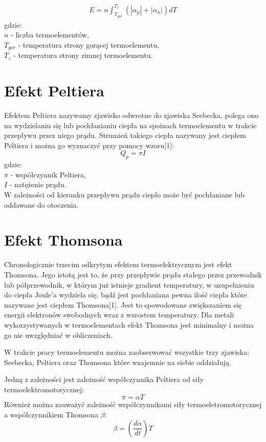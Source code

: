 \documentclass[oneside]{mgr}
\begin{document}
\begin{eqnarray}
    E = n \int_{T_{gor}}^{T_z}(|\alpha_p|+|\alpha_n|)dT
\end{eqnarray}
gdzie: \\
$n$ - liczba termoelementów, \\
$T_{gor}$ - temperatura strony gorącej termoelementu, \\
$T_z$ - temperatura strony zimnej termoelementu.
\section{Efekt Peltiera}
Efektem Peltiera nazywamy zjawisko odwrotne do zjawiska Seebecka, polega ono na wydzielaniu się lub pochłanianiu ciepła na spoinach termoelementu w trakcie przepływu przez niego prądu. Strumień takiego ciepła nazywany jest ciepłem Peltiera i można go wyznaczyć przy pomocy wzoru[1]:
\begin{equation}
    Q_p = \pi I
\end{equation}
gdzie: \\
$\pi$ - współczynnik Peltiera, \\
$I$ - natężenie prądu. \\

W zależności od kierunku przepływu prądu ciepło może być pochłaniane lub oddawane do otoczenia.
\section{Efekt Thomsona}
Chronologicznie trzecim odkrytym efektem termoelektrycznym jest efekt Thomsona. Jego istotą jest to, że przy przepływie prądu stałego przez przewodnik lub półprzewodnik, w którym już istnieje gradient temperatury, w uzupełnieniu do ciepła Joule'a wydziela się, bądź jest pochłaniana pewna ilość ciepła które nazywane jest ciepłem Thomsona[1]. Jest to spowodowane zwiększaniem się energii elektronów swobodnych wraz z wzrostem temperatury. Dla metali wykorzystywanych w termoelementach efekt Thomsona jest minimalny i można go nie uwzględniać w obliczeniach.

W trakcie pracy termoelementu można zaobserwować wszystkie trzy zjawiska: Seebecka, Peltiera oraz Thomsona które wzajemnie na siebie oddziałują.

Jedną z zależności jest zależność współczynnika Peltiera od siły termoelektromotorycznej:
\begin{equation}
    \pi = \alpha T
\end{equation}
Również można zauważyć zależność współczynnikami siły termoeletromotorycznej a współczynnikiem Thomsona $\beta$:
\begin{equation}
    \beta = (\frac{d\alpha}{dt})T
\end{equation}
\end{document}
